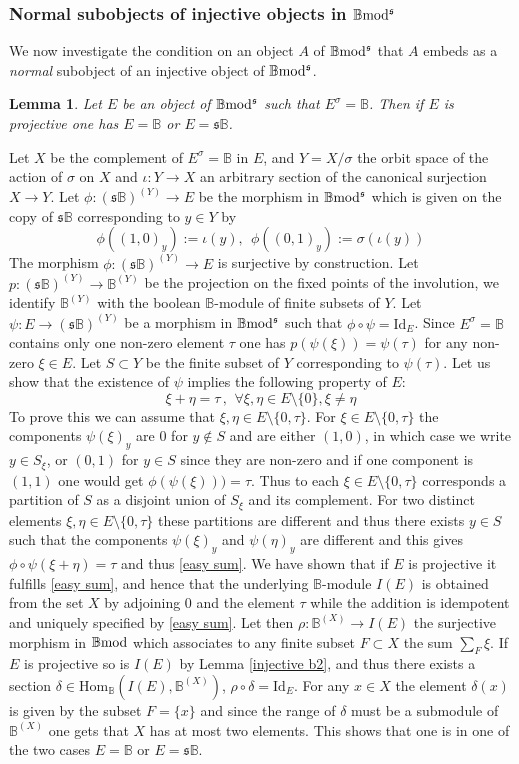 \documentclass[12pt]{article}
\newtheorem{lem}[thm]{Lemma}
\def\Hom{{\rm Hom}}
\def\id{{\rm id}}
\def\B{{\mathbb B}}
\def\qqq{\,,\,~\forall}
\def\id{{\mbox{Id}}}
\def\Hom {{\mbox{Hom}}}
\def\yb{\mathfrak{s}}
\def\bmod{{\rm \B mod}}
\def\b2{{\rm \B mod^{\mathfrak s}}}
\begin{document}
	\subsubsection{Normal subobjects of injective objects in $\b2$}	
	We now investigate the condition on an object $A$ of $\b2$ that $A$ embeds as a {\em normal} subobject of an injective object of $\b2$. 
	\begin{lem}\label{injective fixed2} Let $E$ be an object of $\b2$ such that $E^\sigma=\B$. Then if $E$ is projective one has $E=\B$ or $E=\yb \B$.		
	\end{lem}
\proof Let $X$ be the complement of $E^\sigma=\B$ in $E$, and $Y=X/\sigma$ the orbit space of the action of $\sigma$ on $X$ and $\iota:Y\to X$ an arbitrary section of the canonical surjection $X\to Y$. Let $\phi: (\yb \B)^{(Y)}\to E$ be the morphism in $\b2$ which is given on the copy of $\yb \B$ corresponding to $y\in Y$ by 
$$
\phi((1,0)_y):=\iota(y), \ \ \phi((0,1)_y):=\sigma(\iota(y))
$$
The morphism $\phi: (\yb \B)^{(Y)}\to E$ is surjective by construction. 	Let $p:(\yb \B)^{(Y)}\to \B^{(Y)}$ be the projection on the fixed points of the involution, we identify $\B^{(Y)}$ with the boolean $\B$-module of finite subsets of $Y$. Let $\psi: E\to (\yb \B)^{(Y)}$ be a morphism in $\b2$ such that $\phi\circ \psi=\id_E$. Since $E^\sigma=\B$ contains only one non-zero element $\tau$ one has $p(\psi(\xi))=\psi(\tau)$ for any non-zero $\xi\in E$. Let $S\subset Y$ be the finite subset of $Y$ corresponding to $\psi(\tau)$. Let us show that the existence of $\psi$ implies the following property of $E$:
\begin{equation}\label{easy sum}
	\xi+\eta=\tau \qqq \xi,\eta\in E\setminus \{0\}, \xi\neq \eta
\end{equation}
To prove this we can assume that $\xi,\eta\in E\setminus \{0,\tau\}$. For $\xi \in E\setminus \{0,\tau\}$ the components $\psi(\xi)_y$ are $0$ for $y\notin S$ and are either $(1,0)$, in which case we write $y\in S_\xi$, or $(0,1)$ for $y\in S$ since they are non-zero and if one component is $(1,1)$ one would get $\phi(\psi(\xi)))=\tau$. Thus to each $\xi \in E\setminus \{0,\tau\}$ corresponds a partition of $S$ as a disjoint union of $S_\xi$ and its complement. For two distinct elements $\xi,\eta\in E\setminus \{0,\tau\}$ these partitions are different and thus there exists $y\in S$ such that the components $\psi(\xi)_y$ and $\psi(\eta)_y$ are different and this gives $\phi\circ \psi(\xi+\eta)=\tau$ and thus \eqref{easy sum}. We have shown that if $E$ is projective it fulfills \eqref{easy sum}, and hence that the underlying $\B$-module $I(E)$ is obtained from the set $X$ by adjoining $0$ and the element $\tau$ while the addition is idempotent and uniquely specified by \eqref{easy sum}. Let then $\rho:\B^{(X)}\to I(E)$ the surjective morphism in $\bmod$  which associates  to any finite subset $F\subset X$ the sum $\sum_F\xi$. If $E$ is projective so is $I(E)$ by Lemma \ref{injective b2}, and thus there exists a section $\delta\in \Hom_\B(I(E), \B^{(X)})$, $\rho\circ \delta=\id_E$. For any $x\in X$ the element $\delta(x)$ is given by the subset $F=\{x\}$ and since the range of $\delta$ must be a submodule of  $\B^{(X)}$ one gets that $X$ has at most two elements. This shows that one is in one of the two cases $E=\B$ or $E=\yb \B$.	\endproof 
\end{document}
